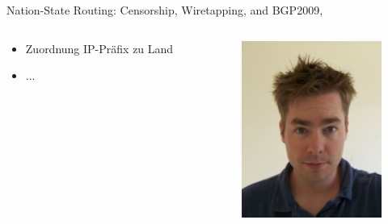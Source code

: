 \documentclass[ngerman,compress,hyperref={bookmarks}]{beamer}
\begin{document}
\begin{frame}{Nation-State Routing: Censorship, Wiretapping, and BGP}{2009, \cite{0903.3218v1}}
  \begin{columns}[c]
    \begin{column}{0.5\textwidth}
      \begin{itemize}
        \item Zuordnung IP-Präfix zu Land
        \item ...
      \end{itemize}
    \end{column}
    \begin{column}{0.09\textwidth}
      \begin{figure}
        \label{karlin}
        \includegraphics[width=1\textwidth]{images/karlin_j}\\

\end{figure}
\end{column}
\end{columns}
\end{frame}
\end{document}
